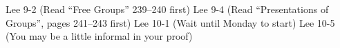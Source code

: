 \documentclass{homework651}
\begin{document}
\begin{problems}

\problem Lee 9-2 (Read ``Free Groups'' 239--240 first)
\problem Lee 9-4 (Read ``Presentations of Groups'', pages 241--243 first)
\problem Lee 10-1 (Wait until Monday to start) 
\problem Lee 10-5 (You may be a little informal in your proof)

\end{problems}
\end{document}
